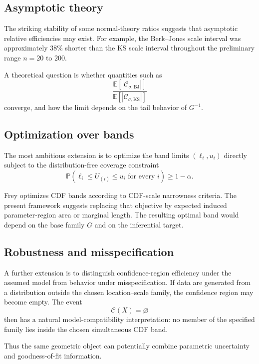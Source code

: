 \documentclass[11pt]{article}
\newcommand{\Pp}{\mathbb{P}}
\newcommand{\Ee}{\mathbb{E}}
\newcommand{\cC}{\mathcal{C}}
\begin{document}
\subsection{Asymptotic theory}

The striking stability of some normal-theory ratios suggests that
asymptotic relative efficiencies may exist.  For example, the
Berk--Jones scale interval was approximately $38\%$ shorter than the KS
scale interval throughout the preliminary range $n=20$ to $200$.

A theoretical question is whether quantities such as
\[
    \frac{
        \Ee[
            |\cC_{\sigma,\mathrm{BJ}}|
        ]
    }{
        \Ee[
            |\cC_{\sigma,\mathrm{KS}}|
        ]
    }
\]
converge, and how the limit depends on the tail behavior of
$G^{-1}$.


\subsection{Optimization over bands}

The most ambitious extension is to optimize the band limits
$(\ell_i,u_i)$ directly subject to the distribution-free coverage
constraint
\[
    \Pp
    \left(
        \ell_i
        \leq
        U_{(i)}
        \leq
        u_i
        \text{ for every }i
    \right)
    \geq
    1-\alpha.
\]

Frey \cite{Frey2008} optimizes CDF bands according to CDF-scale
narrowness criteria.  The present framework suggests replacing that
objective by expected induced parameter-region area or marginal
length.  The resulting optimal band would depend on the base family
$G$ and on the inferential target.


\subsection{Robustness and misspecification}

A further extension is to distinguish confidence-region efficiency
under the assumed model from behavior under misspecification.  If data
are generated from a distribution outside the chosen location--scale
family, the confidence region may become empty.  The event
\[
    \cC(X)=\varnothing
\]
then has a natural model-compatibility interpretation: no member of the
specified family lies inside the chosen simultaneous CDF band.

Thus the same geometric object can potentially combine parametric
uncertainty and goodness-of-fit information.
\end{document}
